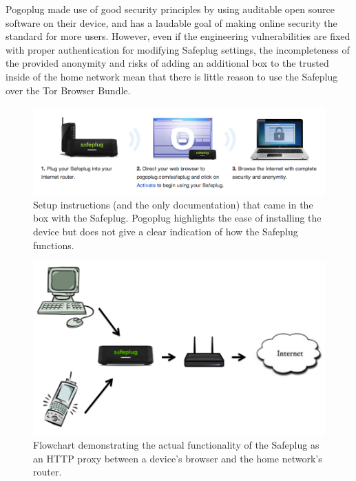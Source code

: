 \documentclass[conference]{IEEEtran}
\begin{document}
Pogoplug made use of good security principles by using auditable open source software on their device, and has a laudable goal of making online security the standard for more users.  However, even if the engineering vulnerabilities are fixed with proper authentication for modifying Safeplug settings, the incompleteness of the provided anonymity and risks of adding an additional box to the trusted inside of the home network mean that there is little reason to use the Safeplug over the Tor Browser Bundle.

\begin{figure}
\centering
\includegraphics[width=.75\textwidth]{instructions}
\caption{Setup instructions (and the only documentation) that came in the box with the Safeplug. Pogoplug highlights the ease of installing the device but does not give a clear indication of how the Safeplug functions.}
\label{fig:instructions}
\end{figure}  

\begin{figure}
\centering
\includegraphics[width=.4\textwidth]{safeplug_flowchart}
\caption{Flowchart demonstrating the actual functionality of the Safeplug as an HTTP proxy between a device's browser and the home network's router.}
\label{fig:flow}
\end{figure}  
\end{document}
